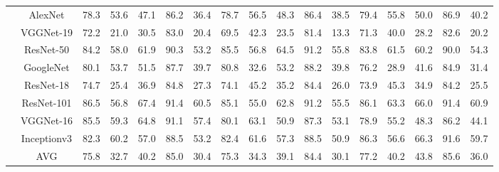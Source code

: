 \documentclass[12pt,italian]{article}
\begin{document}
\begin{tiny}
\begin{longtable}{lcccccccccccccccc}
& AlexNet & 78.3 & 53.6 & 47.1 & 86.2 & 36.4 & 78.7 & 56.5 & 48.3 & 86.4 & 38.5 & 79.4 & 55.8 & 50.0 & 86.9 & 40.2 \\ 
& VGGNet-19 & 72.2 & 21.0 & 30.5 & 83.0 & 20.4 & 69.5 & 42.3 & 23.5 & 81.4 & 13.3 & 71.3 & 40.0 & 28.2 & 82.6 & 20.2 \\ 
& ResNet-50 & 84.2 & 58.0 & 61.9 & 90.3 & 53.2 & 85.5 & 56.8 & 64.5 & 91.2 & 55.8 & 83.8 & 61.5 & 60.2 & 90.0 & 54.3 \\ 
& GoogleNet & 80.1 & 53.7 & 51.5 & 87.7 & 39.7 & 80.8 & 32.6 & 53.2 & 88.2 & 39.8 & 76.2 & 28.9 & 41.6 & 84.9 & 31.4 \\ 
& ResNet-18 & 74.7 & 25.4 & 36.9 & 84.8 & 27.3 & 74.1 & 45.2 & 35.2 & 84.4 & 26.0 & 73.9 & 45.3 & 34.9 & 84.2 & 25.5 \\ 
& ResNet-101 & 86.5 & 56.8 & 67.4 & 91.4 & 60.5 & 85.1 & 55.0 & 62.8 & 91.2 & 55.5 & 86.1 & 63.3 & 66.0 & 91.4 & 60.9 \\ 
& VGGNet-16 & 85.5 & 59.3 & 64.8 & 91.1 & 57.4 & 80.1 & 63.1 & 50.9 & 87.3 & 53.1 & 78.9 & 55.2 & 48.3 & 86.2 & 44.1 \\ 
& Inceptionv3 & 82.3 & 60.2 & 57.0 & 88.5 & 53.2 & 82.4 & 61.6 & 57.3 & 88.5 & 50.9 & 86.3 & 56.6 & 66.3 & 91.6 & 59.7 \\ 
\hline
& AVG & 75.8 & 32.7 & 40.2 & 85.0 & 30.4 & 75.3 & 34.3 & 39.1 & 84.4 & 30.1 & 77.2 & 40.2 & 43.8 & 85.6 & 36.0 \\ 
\hline
\bottomrule
\end{longtable} 

 \pagebreak 
\end{tiny} 
 
\end{document}
